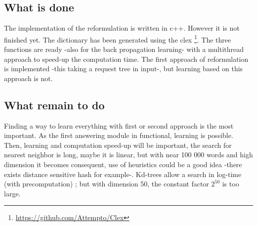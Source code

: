 \subsection{What is done}

The implementation of the reformulation is written in c++. However it is not finished yet. The dictionary has been generated using the clex \footnote{\url{https://github.com/Attempto/Clex}}. The three functions are ready -also for the back propagation learning- with a multithread approach to speed-up the computation time. The first approach of reformulation is implemented -this taking a request tree in input-, but learning based on this approach is not.

\subsection{What remain to do}

Finding a way to learn everything with first or second approach is the most important. As the first answering module in functional, learning is possible. Then, learning and computation speed-up will be important, the search for nearest neighbor is long, maybe it is linear, but with near 100 000 words and high dimension it becomes consequent, use of heuristics could be a good idea -there exists distance sensitive hash for example-. Kd-trees allow a search in log-time (with precomputation) ; but with dimension 50, the constant factor $2^{50}$ is too large. 

